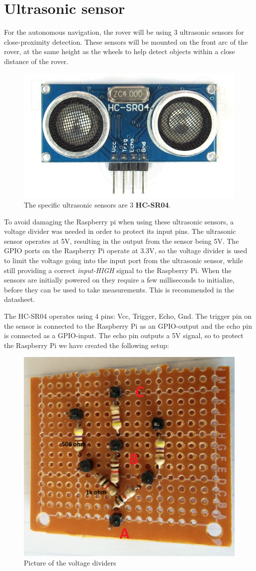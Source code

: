 \clearpage
\section{Ultrasonic sensor}

For the autonomous navigation, the rover will be using 3 ultrasonic sensors for close-proximity detection. These sensors will be mounted on the front arc of the rover, at the same height as the wheels to help detect objects within a close distance of the rover.

\begin{figure}[H]
	\centering
	\includegraphics[width=.3\linewidth]{images/hcsr40.jpg}
	\caption{The specific ultrasonic sensors are 3 \textbf{HC-SR04}.\cite{hcsr40datesheet}}
	\label{fig:ultrasonic_pic}
\end{figure}

To avoid damaging the Raspberry pi when using these ultrasonic sensors, a voltage divider was needed in order to protect its input pins. The ultrasonic sensor operates at 5V, resulting in the output from the sensor being 5V. The GPIO ports on the Raspberry Pi operate at 3.3V, so the voltage divider is used to limit the voltage going into the input port from the ultrasonic sensor, while still providing a correct \textit{input-HIGH} signal to the Raspberry Pi.
When the sensors are initially powered on they require a few milliseconds to initialize, before they can be used to take measurements. This is recommended in the datasheet\cite{hcsr40datesheet}.


The HC-SR04 operates using 4 pins: Vcc, Trigger, Echo, Gnd.
The trigger pin on the sensor is connected to the Raspberry Pi as an GPIO-output and the echo pin is connected as a GPIO-input. The echo pin outputs a 5V signal, so to protect the Raspberry Pi we have created the following setup:

\begin{figure}[H]
	\centering
	\includegraphics[width=.3\linewidth]{images/vd_labelled.jpg}
	\caption{Picture of the voltage dividers}
	\label{fig:voltagedividers}
\end{figure}

